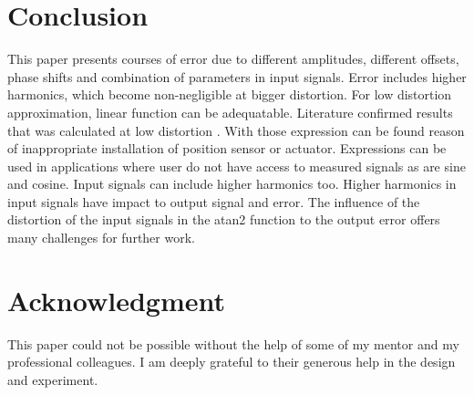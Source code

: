 \documentclass[a4paper]{article}
\begin{document}
\section{Conclusion}

This paper presents courses of error due to different amplitudes, different offsets, phase shifts and combination of parameters in input signals.
Error includes higher harmonics, which become non-negligible at bigger distortion. For low distortion approximation, linear function can be adequatable.
Literature confirmed results that was calculated at low distortion \cite{RLS1}. With those expression can be found reason of inappropriate installation of position sensor or actuator. Expressions can be used in applications where user do not have access to measured signals as are sine and cosine. Input signals can include higher harmonics too. Higher harmonics in input signals have impact to output signal and error.  The influence of the distortion of the input signals in the atan2 function to the output error offers many challenges for further work. 

\section*{Acknowledgment}
This paper could not be possible without the help of some of my mentor and my professional colleagues. I am deeply grateful to their generous help in the design and experiment.
\end{document}
